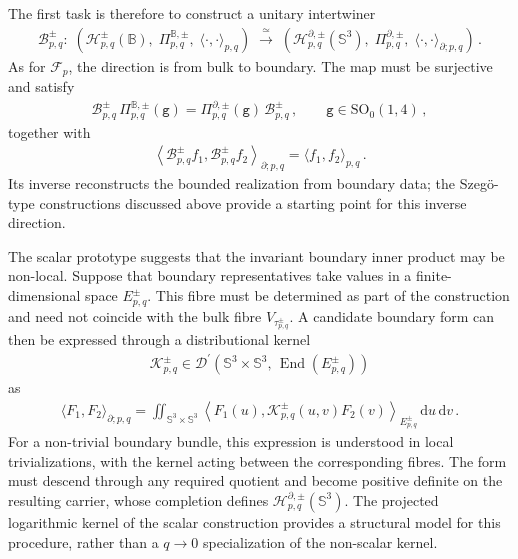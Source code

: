\documentclass{SciPost}
\begin{document}
The first task is therefore to construct a unitary intertwiner
\begin{align}
    {\mathcal B}_{p,q}^{\pm}\colon\;
    \left(
        {\mathcal H}_{p,q}^{\pm}(\mathbb B),\;
        \Pi_{p,q}^{\mathbb B,\pm},\;
        \langle\cdot,\cdot\rangle_{p,q}
    \right)
    \;\xrightarrow{\;\simeq\;}\;
    \left(
        {\mathcal H}_{p,q}^{\partial,\pm}(\mathbb S^3),\;
        \Pi_{p,q}^{\partial,\pm},\;
        \langle\cdot,\cdot\rangle_{\partial;p,q}
    \right) \,.
\end{align}
As for $\mathcal F_p$, the direction is from bulk to boundary. The map must be surjective and satisfy
\begin{align}\label{eq:nonscalar-boundary-intertwining}
    {\mathcal B}_{p,q}^{\pm}\,
    \Pi_{p,q}^{\mathbb B,\pm}(\texttt{g})
    =
    \Pi_{p,q}^{\partial,\pm}(\texttt{g})\,
    {\mathcal B}_{p,q}^{\pm} \,,
    \qquad
    \texttt{g}\in\mathrm{SO}_0(1,4) \,,
\end{align}
together with
\begin{align}\label{eq:nonscalar-boundary-isometry}
    \left\langle
        {\mathcal B}_{p,q}^{\pm}f_1,
        {\mathcal B}_{p,q}^{\pm}f_2
    \right\rangle_{\partial;p,q}
    =
    \langle f_1,f_2\rangle_{p,q} \,.
\end{align}
Its inverse reconstructs the bounded realization from boundary data; the Szeg\"o-type constructions discussed above provide a starting point for this inverse direction.

The scalar prototype suggests that the invariant boundary inner product may be non-local. Suppose that boundary representatives take values in a finite-dimensional space $E_{p,q}^{\pm}$. This fibre must be determined as part of the construction and need not coincide with the bulk fibre $V_{\tau_{p,q}^{\pm}}$. A candidate boundary form can then be expressed through a distributional kernel
\begin{align}
    {\mathcal K}_{p,q}^{\pm}
    \in
    {\mathcal D}^{\prime}
    \left(
        \mathbb S^3\times\mathbb S^3,\,
        \operatorname{End}(E_{p,q}^{\pm})
    \right)
\end{align}
as
\begin{align}\label{eq:nonscalar-kernel-product}
    \langle F_1,F_2\rangle_{\partial;p,q}
    =
    \iint_{\mathbb S^3\times\mathbb S^3}
    \left\langle
        F_1(u),
        {\mathcal K}_{p,q}^{\pm}(u,v)F_2(v)
    \right\rangle_{E_{p,q}^{\pm}}
    \,\mathrm{d}u\,\mathrm{d}v \,.
\end{align}
For a non-trivial boundary bundle, this expression is understood in local trivializations, with the kernel acting between the corresponding fibres. The form must descend through any required quotient and become positive definite on the resulting carrier, whose completion defines ${\mathcal H}_{p,q}^{\partial,\pm}(\mathbb S^3)$. The projected logarithmic kernel of the scalar construction provides a structural model for this procedure, rather than a $q\to0$ specialization of the non-scalar kernel.
\end{document}
